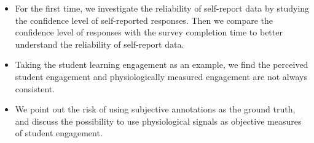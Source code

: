 \documentclass[sigconf]{acmart}
\begin{document}
\begin{itemize}
    \item For the first time, we investigate the reliability of self-report data by studying the confidence level of self-reported responses. Then we  compare the confidence level of responses with the survey completion time to better understand the reliability of self-report data.
    
     \item Taking the student learning engagement as an example, we find the perceived student engagement and physiologically measured engagement are not always consistent.%
     
    \item We point out the risk of using subjective annotations as the ground truth, and discuss the possibility to use physiological signals as objective measures of student engagement. 
\end{itemize}
\end{document}
